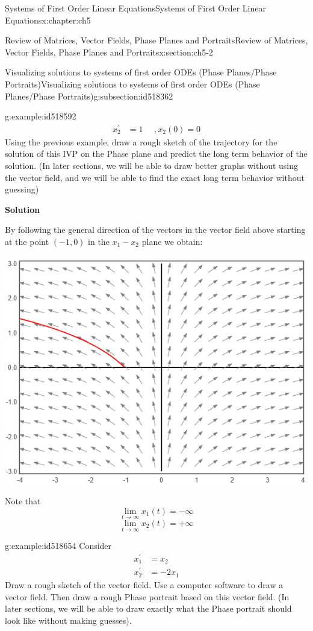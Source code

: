 \documentclass[oneside,10pt,]{book}
\newcommand{\terminology}[1]{\textbf{#1}}
\numberwithin{equation}{section}
\numberwithin{equation}{section}
\newcommand{\amp}{&}
\begin{document}
\begin{chapterptx}{Systems of First Order Linear Equations}{}{Systems of First Order Linear Equations}{}{}{x:chapter:ch5}
\begin{sectionptx}{Review of Matrices, Vector Fields, Phase Planes and Portraits}{}{Review of Matrices, Vector Fields, Phase Planes and Portraits}{}{}{x:section:ch5-2}
\begin{subsectionptx}{Visualizing solutions to systems of first order ODEs (Phase Planes\slash{}Phase Portraits)}{}{Visualizing solutions to systems of first order ODEs (Phase Planes\slash{}Phase Portraits)}{}{}{g:subsection:id518362}
\begin{example}{}{g:example:id518592}
\begin{align*}
x_{2}^{\prime} \amp =1\,\,\,\,\,\,\,\,,x_{2}(0)=0
\end{align*}
Using the previous example, draw a rough sketch of the trajectory for the solution of this IVP on the Phase plane and predict the long term behavior of the solution. (In later sections, we will be able to draw better graphs without using the vector field, and we will be able to find the exact long term behavior without guessing)%
\par
\terminology{Solution}%
\par
By following the general direction of the vectors in the vector field above starting at the point \((-1,0)\) in the \(x_{1}-x_{2}\) plane we obtain: \begin{image}{0}{1}{0}%
\includegraphics[width=\linewidth]{images/5-VecField1c.png}
\end{image}%
 Note that%
\begin{equation*}
\lim_{t\to\infty}x_{1}(t)=-\infty
\end{equation*}
%
\begin{equation*}
\lim_{t\to\infty}x_{2}(t)=+\infty
\end{equation*}
%
\end{example}
\begin{example}{}{g:example:id518654}%
Consider%
\begin{align*}
x_{1}^{\prime} \amp =x_{2}\\
x_{2}^{\prime} \amp =-2x_{1}
\end{align*}
Draw a rough sketch of the vector field. Use a computer software to draw a vector field. Then draw a rough Phase portrait based on this vector field. (In later sections, we will be able to draw exactly what the Phase portrait should look like without making guesses).%

\end{example}
\end{subsectionptx}
\end{sectionptx}
\end{chapterptx}
\end{document}
